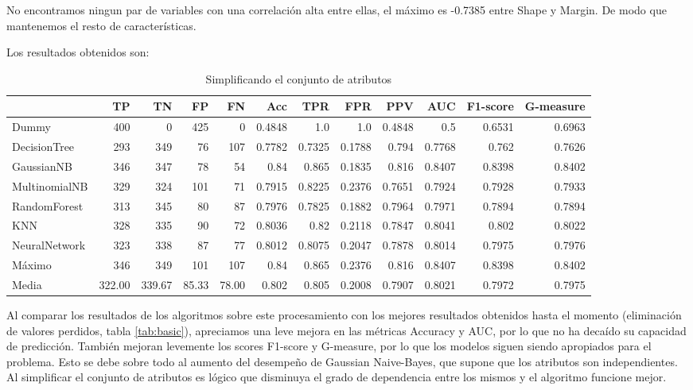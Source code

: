 \documentclass{article}
\begin{document}
No encontramos ningun par de variables con una correlación alta entre
ellas, el máximo es -0.7385 entre Shape y Margin. De modo que
mantenemos el resto de características.

Los resultados obtenidos son:

\begin{table}[H]
\centering
\caption{Simplificando el conjunto de atributos}
\label{tab:features}
\begin{tabular}{|lrrrrrrrrrrr|}
\hline
 & TP & TN & FP & FN & Acc & TPR & FPR & PPV & AUC & F1-score & G-measure\\ \hline
Dummy & 400 & 0 & 425 & 0 & 0.4848 & 1.0 & 1.0 & 0.4848 & 0.5 & 0.6531 & 0.6963\\
DecisionTree & 293 & 349 & 76 & 107 & 0.7782 & 0.7325 & 0.1788 & 0.794 & 0.7768 & 0.762 & 0.7626\\
GaussianNB & 346 & 347 & 78 & 54 & 0.84 & 0.865 & 0.1835 & 0.816 & 0.8407 & 0.8398 & 0.8402\\
MultinomialNB & 329 & 324 & 101 & 71 & 0.7915 & 0.8225 & 0.2376 & 0.7651 & 0.7924 & 0.7928 & 0.7933\\
RandomForest & 313 & 345 & 80 & 87 & 0.7976 & 0.7825 & 0.1882 & 0.7964 & 0.7971 & 0.7894 & 0.7894\\
KNN & 328 & 335 & 90 & 72 & 0.8036 & 0.82 & 0.2118 & 0.7847 & 0.8041 & 0.802 & 0.8022\\
NeuralNetwork & 323 & 338 & 87 & 77 & 0.8012 & 0.8075 & 0.2047 & 0.7878 & 0.8014 & 0.7975 & 0.7976\\ \hline
Máximo & 346 & 349 & 101 & 107 & 0.84 & 0.865 & 0.2376 & 0.816 & 0.8407 & 0.8398 & 0.8402\\
Media & 322.00 & 339.67 & 85.33 & 78.00 & 0.802 & 0.805 & 0.2008 & 0.7907 & 0.8021 & 0.7972 & 0.7975\\
\hline
\end{tabular}
\end{table}

Al comparar los resultados de los algoritmos sobre este procesamiento
con los mejores resultados obtenidos hasta el momento (eliminación de
valores perdidos, tabla \ref{tab:basic}), apreciamos una leve mejora
en las métricas Accuracy y AUC, por lo que no ha decaído su capacidad
de predicción. También mejoran levemente los scores F1-score y
G-measure, por lo que los modelos siguen siendo apropiados para el
problema. Esto se debe sobre todo al aumento del desempeño de
Gaussian Naive-Bayes, que supone que los atributos son
independientes. Al simplificar el conjunto de atributos es lógico que
disminuya el grado de dependencia entre los mismos y el algoritmo
funcione mejor.
\end{document}
